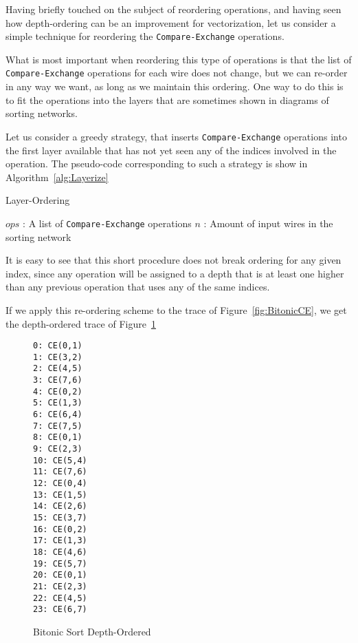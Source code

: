 Having briefly touched on the subject of reordering operations, and having seen how depth-ordering can be an improvement for vectorization, let us consider a simple technique for reordering the \texttt{Compare-Exchange} operations.

What is most important when reordering this type of operations is that the list of \texttt{Compare-Exchange} operations for each wire does not change, but we can re-order in any way we want, as long as we maintain this ordering. One way to do this is to fit the operations into the layers that are sometimes shown in diagrams of sorting networks.

Let us consider a greedy strategy, that inserts \texttt{Compare-Exchange} operations into the first layer available that has not yet seen any of the indices involved in the operation. The pseudo-code corresponding to such a strategy is show in Algorithm~\ref{alg:Layerize}

\begin{algorithm}
\caption{Layer-Ordering}\label{alg:Layerize}
\begin{algorithmic}[1]
	\Statex $ops$ : A list of \texttt{Compare-Exchange} operations
	\Statex $n$ : Amount of input wires in the sorting network
\EndFor
{}
\EndProcedure
\end{algorithmic}
\end{algorithm}

It is easy to see that this short procedure does not break ordering for any given index, since any operation will be assigned to a depth that is at least one higher than any previous operation that uses any of the same indices.

If we apply this re-ordering scheme to the trace of Figure~\ref{fig:BitonicCE}, we get the depth-ordered trace of Figure~\ref{fig:BitonicCEL} 


\begin{figure}
\begin{multicols}{3}
\begin{verbatim}
0: CE(0,1)
1: CE(3,2)
2: CE(4,5)
3: CE(7,6)
4: CE(0,2)
5: CE(1,3)
6: CE(6,4)
7: CE(7,5)
8: CE(0,1)
9: CE(2,3)
10: CE(5,4)
11: CE(7,6)
12: CE(0,4)
13: CE(1,5)
14: CE(2,6)
15: CE(3,7)
16: CE(0,2)
17: CE(1,3)
18: CE(4,6)
19: CE(5,7)
20: CE(0,1)
21: CE(2,3)
22: CE(4,5)
23: CE(6,7)
\end{verbatim}
\end{multicols}
\caption{Bitonic Sort Depth-Ordered}
\label{fig:BitonicCEL}
\end{figure}

